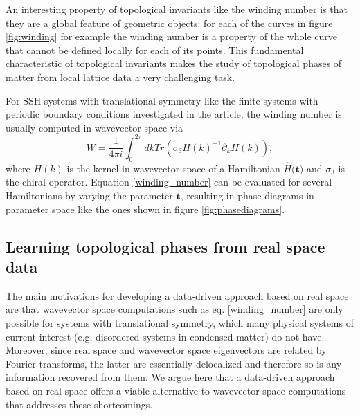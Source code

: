 \documentclass[fleqn,10pt]{wlscirep}
\begin{document}
An interesting property of topological invariants like the winding number is that they are a global feature of geometric objects: for each of the curves in figure \ref{fig:winding} for example the winding number is a property of the whole curve that cannot be defined locally for each of its points. This fundamental characteristic of topological invariants makes the study of topological phases of matter from local lattice data a very challenging task.   

For SSH systems with translational symmetry like the finite systems with periodic boundary conditions investigated in the article, the winding number is usually computed in wavevector space via
\begin{equation}\label{winding_number}
W=\frac{1}{4\pi i}\int_0^{2\pi} dk Tr( \sigma_3 H(k)^{-1} \partial_k H(k)),
\end{equation}
where $H(k)$ is the kernel in wavevector space of a Hamiltonian $\hat{H}$$($$\mathbf{t}$$)$ and $\sigma_3$ is the chiral operator. Equation \eqref{winding_number} can be evaluated for several Hamiltonians by varying the parameter $\mathbf{t}$, resulting in phase diagrams in parameter space like the ones shown in figure \ref{fig:phasediagrams}.


\subsection*{Learning topological phases from real space data}

The main motivations for developing a data-driven approach based on real space are that wavevector space computations such as eq. \eqref{winding_number} are only possible for systems with translational symmetry, which many physical systems of current interest (e.g. disordered systems in condensed matter) do not have. Moreover, since real space and wavevector space eigenvectors are related by Fourier transforms, the latter are essentially delocalized and therefore so is any information recovered from them. We argue here that a data-driven approach based on real space offers a viable alternative to wavevector space computations that addresses these shortcomings.
\end{document}
